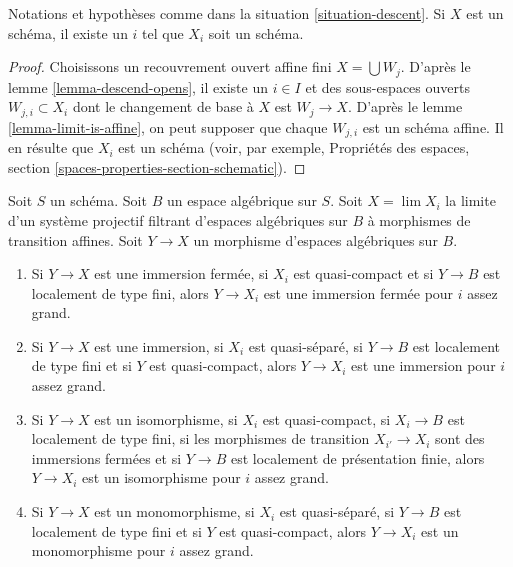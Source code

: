 \begin{lemma}
\label{lemma-limit-is-scheme}
Notations et hypothèses comme dans la situation \ref{situation-descent}.
Si $X$ est un schéma, il existe un $i$ tel que $X_i$ soit un schéma.
\end{lemma}

\begin{proof}
Choisissons un recouvrement ouvert affine fini $X = \bigcup W_j$.
D'après le lemme \ref{lemma-descend-opens},
il existe un $i \in I$ et des sous-espaces ouverts $W_{j, i} \subset X_i$
dont le changement de base à $X$ est $W_j \to X$. D'après le
lemme \ref{lemma-limit-is-affine}, on peut supposer que
chaque $W_{j, i}$ est un schéma affine. Il en résulte que $X_i$
est un schéma (voir, par exemple,
Propriétés des espaces, section \ref{spaces-properties-section-schematic}).
\end{proof}

\begin{lemma}
\label{lemma-finite-type-eventually-closed}
Soit $S$ un schéma. Soit $B$ un espace algébrique sur $S$.
Soit $X = \lim X_i$ la limite d'un système projectif filtrant
d'espaces algébriques sur $B$ à morphismes de transition affines.
Soit $Y \to X$ un morphisme d'espaces algébriques sur $B$.
\begin{enumerate}
\item Si $Y \to X$ est une immersion fermée, si $X_i$ est quasi-compact et si
$Y \to B$ est localement de type fini, alors $Y \to X_i$ est une immersion
fermée pour $i$ assez grand.
\item Si $Y \to X$ est une immersion, si $X_i$ est quasi-séparé, si $Y \to B$
est localement de type fini et si $Y$ est quasi-compact, alors $Y \to X_i$ est
une immersion pour $i$ assez grand.
\item Si $Y \to X$ est un isomorphisme, si $X_i$ est quasi-compact,
si $X_i \to B$ est localement de type fini, si les morphismes de transition
$X_{i'} \to X_i$ sont des immersions fermées et si $Y \to B$ est localement
de présentation finie, alors $Y \to X_i$ est un isomorphisme pour $i$
assez grand.
\item Si $Y \to X$ est un monomorphisme, si $X_i$ est quasi-séparé,
si $Y \to B$ est localement de type fini et si $Y$ est quasi-compact, alors
$Y \to X_i$ est un monomorphisme pour $i$ assez grand.
\end{enumerate}
\end{lemma}

